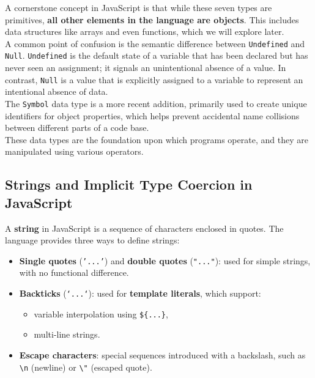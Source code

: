 \documentclass{scrbook}
\begin{document}
A cornerstone concept in JavaScript is that while these seven types are primitives, \textbf{all other elements in the language are objects}. This includes data structures like arrays and even functions, which we will explore later. \\

A common point of confusion is the semantic difference between \texttt{Undefined} and \texttt{Null}. \texttt{Undefined} is the default state of a variable that has been declared but has never seen an assignment; it signals an unintentional absence of a value. In contrast, \texttt{Null} is a value that is explicitly assigned to a variable to represent an intentional absence of data. \\

The \texttt{Symbol} data type is a more recent addition, primarily used to create unique identifiers for object properties, which helps prevent accidental name collisions between different parts of a code base. \\

These data types are the foundation upon which programs operate, and they are manipulated using various operators.

\subsection{Strings and Implicit Type Coercion in JavaScript}

A \textbf{string} in JavaScript is a sequence of characters enclosed in quotes. The language provides three ways to define strings:

\begin{itemize}
    \item \textbf{Single quotes} (\texttt{'...'}) and \textbf{double quotes} (\texttt{"..."}): used for simple strings, with no functional difference.
    
    \item \textbf{Backticks} (\texttt{`...`}): used for \textbf{template literals}, which support:
    \begin{itemize}
        \item variable interpolation using \texttt{\$\{...\}},
        \item multi-line strings.
    \end{itemize}
    
    \item \textbf{Escape characters}: special sequences introduced with a backslash, such as \texttt{\textbackslash n} (newline) or \texttt{\textbackslash "} (escaped quote).
\end{itemize}
\end{document}
